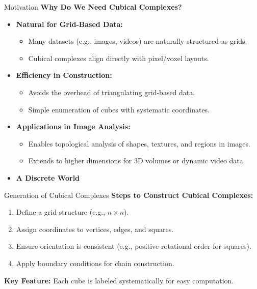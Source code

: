 \documentclass[aspectratio=169,xcolor=dvipsnames]{beamer}
\begin{document}
\begin{frame}{Motivation}
    \textbf{Why Do We Need Cubical Complexes?}
    \begin{itemize}
        \item \textbf{Natural for Grid-Based Data:}
        \begin{itemize}
            \item Many datasets (e.g., images, videos) are naturally structured as grids.
            \item Cubical complexes align directly with pixel/voxel layouts.
        \end{itemize}
        
        \item \textbf{Efficiency in Construction:}
        \begin{itemize}
            \item Avoids the overhead of triangulating grid-based data.
            \item Simple enumeration of cubes with systematic coordinates.
        \end{itemize}
        
        \item \textbf{Applications in Image Analysis:}
        \begin{itemize}
            \item Enables topological analysis of shapes, textures, and regions in images.
            \item Extends to higher dimensions for 3D volumes or dynamic video data.
        \end{itemize}
        
        \item \textbf{A Discrete World}
    \end{itemize}
\end{frame}


\begin{frame}{Generation of Cubical Complexes}
    \textbf{Steps to Construct Cubical Complexes:}
    \begin{enumerate}
        \item Define a grid structure (e.g., \( n \times n \)).
        \item Assign coordinates to vertices, edges, and squares.
        \item Ensure orientation is consistent (e.g., positive rotational order for squares).
        \item Apply boundary conditions for chain construction.
    \end{enumerate}

    \vspace{1em}
    \textbf{Key Feature:} Each cube is labeled systematically for easy computation.
\end{frame}
\end{document}
